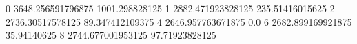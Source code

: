 0 3648.256591796875 1001.298828125
1 2882.471923828125 235.51416015625
2 2736.30517578125 89.347412109375
4 2646.957763671875 0.0
6 2682.899169921875 35.94140625
8 2744.677001953125 97.71923828125
